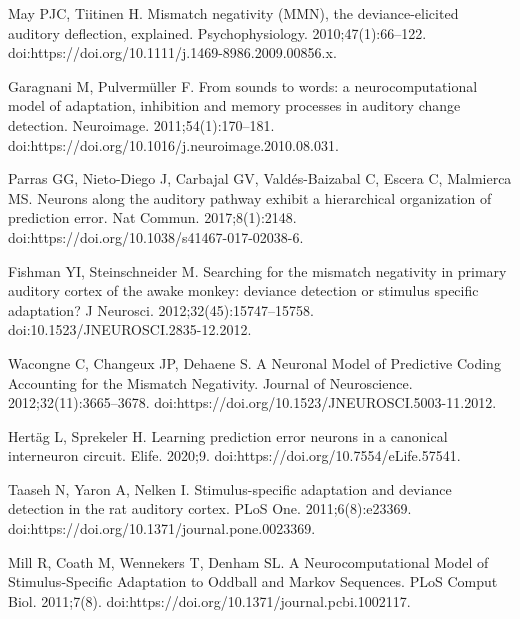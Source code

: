 \documentclass[10pt,letterpaper]{article}
\begin{document}
\begin{thebibliography}{100}
  May PJC, Tiitinen H.
  \newblock Mismatch negativity ({MMN)}, the deviance-elicited auditory
    deflection, explained.
  \newblock Psychophysiology. 2010;47(1):66--122.
  \newblock doi:{https://doi.org/10.1111/j.1469-8986.2009.00856.x}.
  
  Garagnani M, Pulverm{\"u}ller F.
  \newblock From sounds to words: a neurocomputational model of adaptation,
    inhibition and memory processes in auditory change detection.
  \newblock Neuroimage. 2011;54(1):170--181.
  \newblock doi:{https://doi.org/10.1016/j.neuroimage.2010.08.031}.
  
  Parras GG, Nieto-Diego J, Carbajal GV, Vald{\'e}s-Baizabal C, Escera C,
    Malmierca MS.
  \newblock Neurons along the auditory pathway exhibit a hierarchical
    organization of prediction error.
  \newblock Nat Commun. 2017;8(1):2148.
  \newblock doi:{https://doi.org/10.1038/s41467-017-02038-6}.
  
  Fishman YI, Steinschneider M.
  \newblock Searching for the mismatch negativity in primary auditory cortex of
    the awake monkey: deviance detection or stimulus specific adaptation?
  \newblock J Neurosci. 2012;32(45):15747--15758.
  \newblock doi:{10.1523/JNEUROSCI.2835-12.2012}.
  
  Wacongne C, Changeux JP, Dehaene S.
  \newblock A {Neuronal} {Model} of {Predictive} {Coding} {Accounting} for the
    {Mismatch} {Negativity}.
  \newblock Journal of Neuroscience. 2012;32(11):3665--3678.
  \newblock doi:{https://doi.org/10.1523/JNEUROSCI.5003-11.2012}.
  
  Hert{\"a}g L, Sprekeler H.
  \newblock Learning prediction error neurons in a canonical interneuron circuit.
  \newblock Elife. 2020;9.
  \newblock doi:{https://doi.org/10.7554/eLife.57541}.
  
  Taaseh N, Yaron A, Nelken I.
  \newblock Stimulus-specific adaptation and deviance detection in the rat
    auditory cortex.
  \newblock PLoS One. 2011;6(8):e23369.
  \newblock doi:{https://doi.org/10.1371/journal.pone.0023369}.
  
  Mill R, Coath M, Wennekers T, Denham SL.
  \newblock A {Neurocomputational} {Model} of {Stimulus}-{Specific} {Adaptation}
    to {Oddball} and {Markov} {Sequences}.
  \newblock PLoS Comput Biol. 2011;7(8).
  \newblock doi:{https://doi.org/10.1371/journal.pcbi.1002117}.
  

\end{thebibliography}
\end{document}

